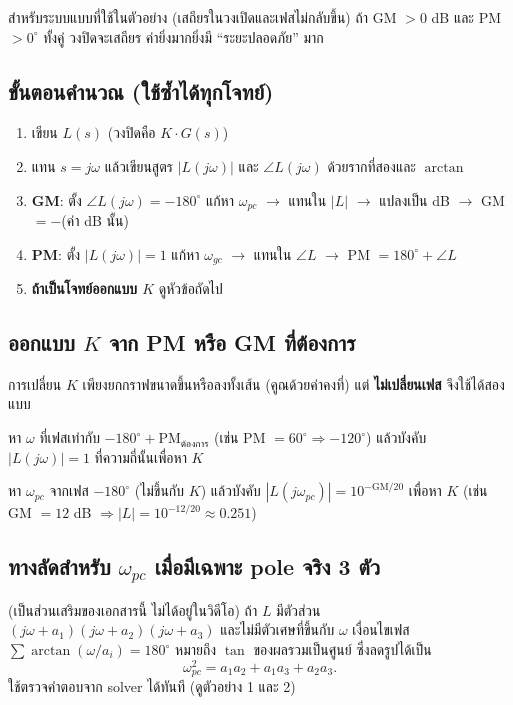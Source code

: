 \documentclass[12pt,a4paper]{article}
\newcommand{\jw}{j\omega}
\newcommand{\atan}{\operatorname{arctan}}
\begin{document}
สำหรับระบบแบบที่ใช้ในตัวอย่าง (เสถียรในวงเปิดและเฟสไม่กลับขึ้น) ถ้า GM $>0$ dB และ PM $>0^\circ$ ทั้งคู่ วงปิดจะเสถียร ค่ายิ่งมากยิ่งมี ``ระยะปลอดภัย'' มาก

\subsection{ขั้นตอนคำนวณ (ใช้ซ้ำได้ทุกโจทย์)}
\begin{enumerate}[leftmargin=1.6em,itemsep=2pt]
\item เขียน $L(s)$ (วงปิดคือ $K\cdot G(s)$)
\item แทน $s=\jw$ แล้วเขียนสูตร $|L(\jw)|$ และ $\angle L(\jw)$ ด้วยรากที่สองและ $\atan$
\item \textbf{GM}: ตั้ง $\angle L(\jw)=-180^\circ$ แก้หา $\omega_{pc}$ $\to$ แทนใน $|L|$ $\to$ แปลงเป็น dB $\to$ GM $=-$(ค่า dB นั้น)
\item \textbf{PM}: ตั้ง $|L(\jw)|=1$ แก้หา $\omega_{gc}$ $\to$ แทนใน $\angle L$ $\to$ PM $=180^\circ+\angle L$
\item \textbf{ถ้าเป็นโจทย์ออกแบบ $K$} ดูหัวข้อถัดไป
\end{enumerate}

\subsection{ออกแบบ $K$ จาก PM หรือ GM ที่ต้องการ}
การเปลี่ยน $K$ เพียงยกกราฟขนาดขึ้นหรือลงทั้งเส้น (คูณด้วยค่าคงที่) แต่ \textbf{ไม่เปลี่ยนเฟส} จึงใช้ได้สองแบบ
\begin{description}[leftmargin=1.2em,itemsep=2pt]
\item[กำหนด PM] หา $\omega$ ที่เฟสเท่ากับ $-180^\circ+\mathrm{PM}_{\text{ต้องการ}}$ (เช่น PM $=60^\circ\Rightarrow -120^\circ$) แล้วบังคับ $|L(\jw)|=1$ ที่ความถี่นั้นเพื่อหา $K$
\item[กำหนด GM] หา $\omega_{pc}$ จากเฟส $-180^\circ$ (ไม่ขึ้นกับ $K$) แล้วบังคับ $|L(j\omega_{pc})|=10^{-\mathrm{GM}/20}$ เพื่อหา $K$ (เช่น GM $=12$ dB $\Rightarrow |L|=10^{-12/20}\approx0.251$)
\end{description}

\subsection{ทางลัดสำหรับ $\omega_{pc}$ เมื่อมีเฉพาะ pole จริง 3 ตัว}
(เป็นส่วนเสริมของเอกสารนี้ ไม่ได้อยู่ในวิดีโอ) ถ้า $L$ มีตัวส่วน $(\jw+a_1)(\jw+a_2)(\jw+a_3)$ และไม่มีตัวเศษที่ขึ้นกับ $\omega$ เงื่อนไขเฟส $\sum\atan(\omega/a_i)=180^\circ$ หมายถึง $\tan$ ของผลรวมเป็นศูนย์ ซึ่งลดรูปได้เป็น
\[
\omega_{pc}^{2}=a_1a_2+a_1a_3+a_2a_3 .
\]
ใช้ตรวจคำตอบจาก solver ได้ทันที (ดูตัวอย่าง 1 และ 2)
\end{document}
